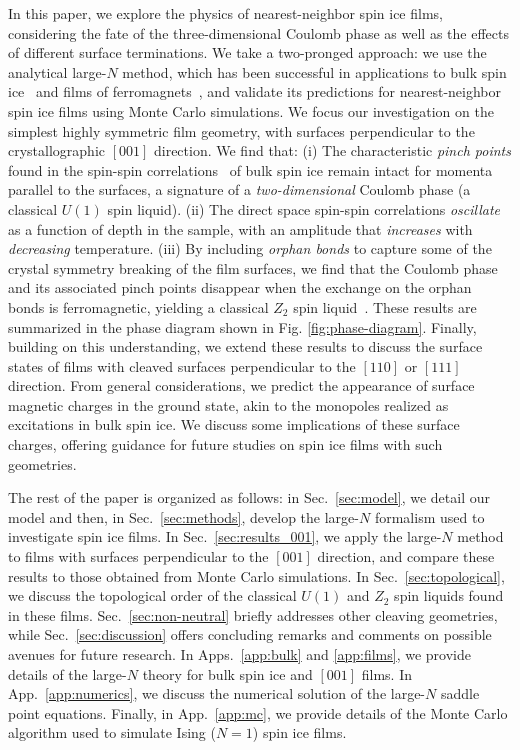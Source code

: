 \documentclass[aps,prx,reprint,runinaddress,superscriptaddress,amsmath,amssymb,floatfix,longbibliography]{revtex4-1}
\begin{document}
In this paper, we explore the physics of nearest-neighbor spin ice films, considering the fate of the three-dimensional Coulomb phase as well as the effects of different surface terminations. We take a two-pronged approach: we use the analytical large-$N$ method, which has been successful in applications to bulk spin ice~\cite{Isakov2004} and films of ferromagnets~\cite{Dantchev2014}, and validate its predictions for nearest-neighbor spin ice films using Monte Carlo simulations. We focus our investigation on the simplest highly symmetric film geometry, with surfaces perpendicular to the crystallographic $[001]$ direction. We find that: (i) The characteristic \emph{pinch points} found in the spin-spin correlations~\cite{Henley2005,Henley2010} of bulk spin ice remain intact for momenta parallel to the surfaces, a signature of a \emph{two-dimensional} Coulomb phase (a classical $U(1)$ spin liquid). (ii) The direct space spin-spin correlations \emph{oscillate} as a function of depth in the sample, with an amplitude that \emph{increases} with \emph{decreasing} temperature. (iii) By including \emph{orphan bonds} to capture some of the crystal symmetry breaking of the film surfaces, we find that the Coulomb phase and its associated pinch points disappear when the exchange on the orphan bonds is ferromagnetic, yielding a classical $Z_2$ spin liquid~\cite{Rehn2017}. These results are summarized in the phase diagram shown in Fig. \ref{fig:phase-diagram}. Finally, building on this understanding, we extend these results to discuss the surface states of films with cleaved surfaces perpendicular to the $[110]$ or $[111]$ direction. From general considerations, we predict the appearance of surface magnetic charges in the ground state, akin to the monopoles realized as excitations in bulk spin ice. We discuss some implications of these surface charges, offering guidance for future studies on spin ice films with such geometries.

The rest of the paper is organized as follows: in Sec.~\ref{sec:model}, we detail our model and then, in Sec.~\ref{sec:methods}, develop the large-$N$ formalism used to investigate spin ice films. In Sec.~\ref{sec:results_001}, we apply the large-$N$ method to films with surfaces perpendicular to the $[001]$ direction, and compare these results to those obtained from Monte Carlo simulations. In Sec.~\ref{sec:topological}, we discuss the topological order of the classical $U(1)$ and $Z_2$ spin liquids found in these films.  Sec.~\ref{sec:non-neutral} briefly addresses other cleaving geometries, while Sec.~\ref{sec:discussion} offers concluding remarks and comments on possible avenues for future research. In Apps.~\ref{app:bulk} and \ref{app:films}, we provide details of the large-$N$ theory for bulk spin ice and $[001]$ films. In App.~\ref{app:numerics}, we discuss the numerical solution of the large-$N$ saddle point equations. Finally, in App.~\ref{app:mc}, we provide details of the Monte Carlo algorithm used to simulate Ising ($N=1$) spin ice films.
\end{document}
